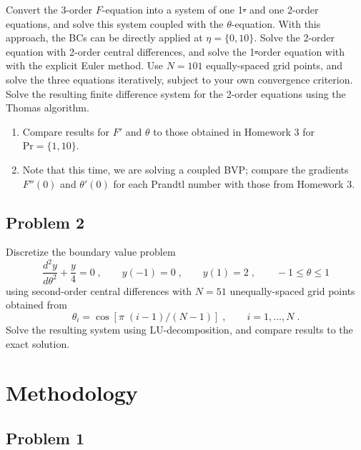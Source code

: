 \documentclass[11pt]{article}
\begin{document}
Convert the 3\rd-order $F$-equation into a system of one 1\st- and one 2\nd-order equations, and solve this system coupled with the $\theta$-equation. With this approach, the BCs can be directly applied at $\eta = \{0, 10\}$. Solve the 2\nd-order equation with 2\nd-order central differences, and solve the 1\st-order equation with with the explicit Euler method. Use $N = 101$ equally-spaced grid points, and solve the three equations iteratively, subject to your own convergence criterion. Solve the resulting finite difference system for the 2\nd-order equations using the Thomas algorithm.
\begin{enumerate}
\item Compare results for $F'$ and $\theta$ to those obtained in Homework 3 for $\text{Pr} = \{1, 10\}$.
\item Note that this time, we are solving a coupled BVP; compare the gradients $F''(0)$ and $\theta'(0)$ for each Prandtl number with those from Homework 3.
\end{enumerate}

\subsection{Problem 2}

Discretize the boundary value problem
\begin{equation}
\frac{d^2 y}{d \theta^2} + \frac{y}{4} = 0
\;,\qquad
y(-1) = 0
\;,\qquad
y(1) = 2
\;,\qquad
-1 \le \theta \le 1
\label{eq:prob2_ode}
\end{equation}
using second-order central differences with $N = 51$ unequally-spaced grid points obtained from
\begin{equation}
\theta_i = \cos \left[ \pi \; (i-1) / (N-1) \right]
\;,\qquad
i = 1, \dots, N
\;.
\label{eq:prob2_gridpoints}
\end{equation}
Solve the resulting system using LU-decomposition, and compare results to the exact solution.

\section{Methodology} %

\subsection{Problem 1}
\end{document}
